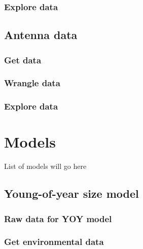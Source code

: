 \documentclass[
]{book}
\begin{document}
\hypertarget{explore-data-2}{%
\subsection{Explore data}\label{explore-data-2}}

\hypertarget{dataAntenna}{%
\section{Antenna data}\label{dataAntenna}}

\hypertarget{get-data-3}{%
\subsection{Get data}\label{get-data-3}}

\hypertarget{wrangle-data-3}{%
\subsection{Wrangle data}\label{wrangle-data-3}}

\hypertarget{explore-data-3}{%
\subsection{Explore data}\label{explore-data-3}}

\hypertarget{models}{%
\chapter{Models}\label{models}}

List of models will go here

\hypertarget{modelYOY}{%
\section{Young-of-year size model}\label{modelYOY}}

\hypertarget{raw-data-for-yoy-model}{%
\subsection{Raw data for YOY model}\label{raw-data-for-yoy-model}}

\hypertarget{get-environmental-data}{%
\subsection{Get environmental data}\label{get-environmental-data}}
\end{document}
